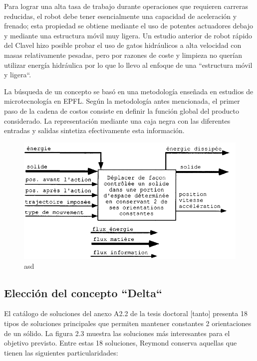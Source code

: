     Para lograr una alta tasa de trabajo durante operaciones que requieren carreras reducidas, el robot debe tener esencialmente una capacidad de aceleración y frenado; esta propiedad se obtiene mediante el uso de potentes actuadores debajo y mediante una estructura móvil muy ligera. Un estudio anterior de robot rápido del Clavel hizo posible probar el uso de gatos hidráulicos a alta velocidad con masas relativamente pesadas, pero por razones de coste y limpieza no querían utilizar energía hidráulica por lo que lo llevo al enfoque de una ``estructura móvil y ligera``.
    
    La búsqueda de un concepto se basó en una metodología enseñada en estudios de microtecnología en EPFL. Según la metodología antes mencionada, el primer paso de la cadena de costos consiste en definir la función global del producto considerado. La representación mediante una caja negra con las diferentes entradas y salidas sintetiza efectivamente esta información.
    
    \begin{figure}[htb]
        \centering
        \includegraphics[width=0.8\linewidth]{Main/Chapter3/Images3/3-3/caja-negra-reymond.png}
        \caption{asd}
        \label{f:Cap3-3_caja_negra_reymond}
    \end{figure}
    
    \newpage
    
    \subsection{Elección del concepto ``Delta``}
    El catálogo de soluciones del anexo A2.2 de la tesis doctoral [tanto] presenta 18 tipos de soluciones principales que permiten mantener constantes 2 orientaciones de un sólido. La figura 2.3 muestra las soluciones más interesantes para el objetivo previsto. Entre estas 18 soluciones, Reymond conserva aquellas que tienen las siguientes particularidades:

